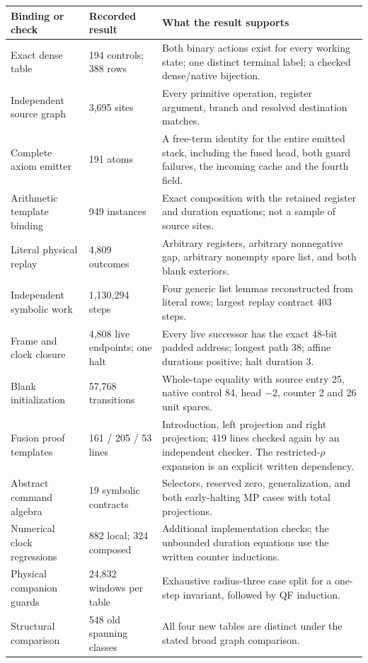 
\begin{longtable}{@{}p{.30\linewidth}p{.23\linewidth}p{.41\linewidth}@{}}
\toprule
Binding or check & Recorded result & What the result supports\\
\midrule\endhead
Exact dense table & 194 controls; 388 rows & Both binary actions exist for
every working state; one distinct terminal label; a checked dense/native
bijection.\\
Independent source graph & 3,695 sites & Every primitive operation,
register argument, branch and resolved destination matches.\\
Complete axiom emitter & 191 atoms & A free-term identity for the entire
emitted stack, including the fused head, both guard failures, the incoming
cache and the fourth field.\\
Arithmetic template binding & 949 instances & Exact composition with the
retained register and duration equations; not a sample of source sites.\\
Literal physical replay & 4,809 outcomes & Arbitrary registers, arbitrary
nonnegative gap, arbitrary nonempty spare list, and both blank exteriors.\\
Independent symbolic work & 1,130,294 steps & Four generic list lemmas
reconstructed from literal rows; largest replay contract 403 steps.\\
Frame and clock closure & 4,808 live endpoints;
one halt & Every live successor has the exact 48-bit padded address;
longest path 38; affine durations positive; halt duration 3.\\
Blank initialization & 57,768 transitions & Whole-tape equality with
source entry 25, native control 84, head $-2$, counter 2 and 26 unit spares.\\
Fusion proof templates & 161 / 205 / 53 lines & Introduction, left
projection and right projection; 419 lines checked again by an independent
checker. The restricted-$\rho$ expansion is an explicit written dependency.\\
Abstract command algebra & 19 symbolic contracts & Selectors, reserved
zero, generalization, and both early-halting MP cases with total projections.\\
Numerical clock regressions & 882 local; 324 composed & Additional
implementation checks; the unbounded duration equations use the written
counter inductions.\\
Physical companion guards & 24,832 windows per table & Exhaustive
radius-three case split for a one-step invariant, followed by QF induction.\\
Structural comparison & 548 old spanning classes & All four new tables
are distinct under the stated broad graph comparison.\\
\bottomrule
\end{longtable}
